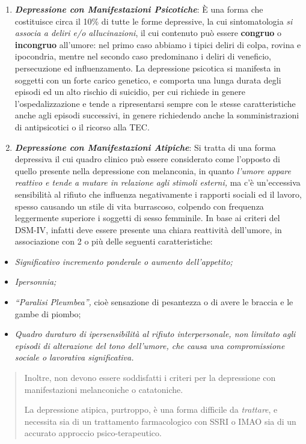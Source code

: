 \documentclass[]{article}
\begin{document}
\begin{enumerate}
\def\labelenumi{\arabic{enumi}.}
\item
  \textbf{\emph{Depressione con Manifestazioni Psicotiche}}: È una forma
  che costituisce circa il 10\% di tutte le forme depressive, la cui
  sintomatologia \emph{si associa a deliri e/o allucinazioni}, il cui
  contenuto può essere \textbf{congruo} o \textbf{incongruo} all'umore:
  nel primo caso abbiamo i tipici deliri di colpa, rovina e ipocondria,
  mentre nel secondo caso predominano i deliri di veneficio,
  persecuzione ed influenzamento. La depressione psicotica si manifesta
  in soggetti con un forte carico genetico, e comporta una lunga durata
  degli episodi ed un alto rischio di suicidio, per cui richiede in
  genere l'ospedalizzazione e tende a ripresentarsi sempre con le stesse
  caratteristiche anche agli episodi successivi, in genere richiedendo
  anche la somministrazioni di antipsicotici o il ricorso alla TEC.
\item
  \textbf{\emph{Depressione con Manifestazioni Atipiche}}: Si tratta di
  una forma depressiva il cui quadro clinico può essere considerato come
  l'opposto di quello presente nella depressione con melanconia, in
  quanto \emph{l'umore appare reattivo e tende a mutare in relazione
  agli stimoli esterni,} ma c'è un'eccessiva sensibilità al rifiuto che
  influenza negativamente i rapporti sociali ed il lavoro, spesso
  causando un stile di vita burrascoso, colpendo con frequenza
  leggermente superiore i soggetti di sesso femminile. In base ai
  criteri del DSM-IV, infatti deve essere presente una chiara reattività
  dell'umore, in associazione con 2 o più delle seguenti
  caratteristiche:
\end{enumerate}

\begin{itemize}
\item
  \emph{Significativo incremento ponderale o aumento dell'appetito;}
\item
  \emph{Ipersonnia;}
\item
  \emph{``Paralisi Pleumbea'',} cioè sensazione di pesantezza o di avere
  le braccia e le gambe di piombo;
\item
  \emph{Quadro duraturo di ipersensibilità al rifiuto interpersonale,
  non limitato agli episodi di alterazione del tono dell'umore, che
  causa una compromissione sociale o lavorativa significativa.}
\end{itemize}

\begin{quote}
Inoltre, non devono essere soddisfatti i criteri per la depressione con
manifestazioni melanconiche o catatoniche.

La depressione atipica, purtroppo, è una forma difficile da
\emph{trattare}, e necessita sia di un trattamento farmacologico con
SSRI o IMAO sia di un accurato approccio psico-terapeutico.
\end{quote}
\end{document}
